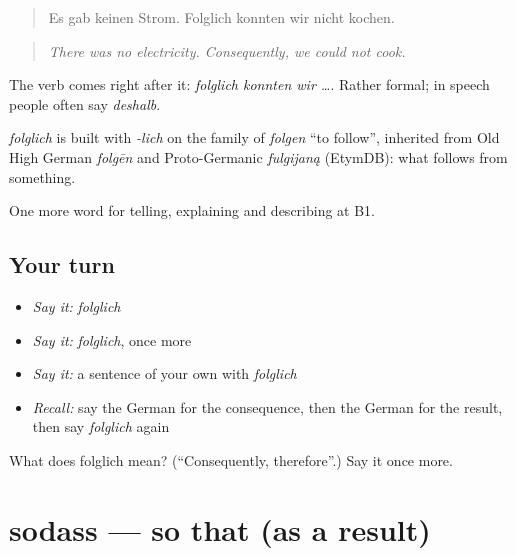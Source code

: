 \begin{quote}
Es gab keinen Strom. Folglich konnten wir nicht kochen.
\end{quote}

\begin{quote}
\emph{There was no electricity. Consequently, we could not cook.}
\end{quote}

The verb comes right after it: \emph{folglich konnten wir …}. Rather formal; in speech people often say \emph{deshalb}.

\begin{cousinweb}
\emph{folglich} is built with \emph{-lich} on the family of \emph{folgen} \textquotedblleft{}to follow\textquotedblright{}, inherited from Old High German \emph{folgēn} and Proto-Germanic \emph{fulgijaną} (EtymDB): what follows from something.
\end{cousinweb}

\begin{grammarlens}[title={What you've built}]
One more word for telling, explaining and describing at B1.
\end{grammarlens}

\subsection*{Your turn}
\begin{itemize}
\raggedright
  \item \emph{Say it:} \emph{folglich}
  \item \emph{Say it:} \emph{folglich}, once more
  \item \emph{Say it:} a sentence of your own with \emph{folglich}
  \item \emph{Recall:} say the German for the consequence, then the German for the result, then say \emph{folglich} again
\end{itemize}

\begin{tcolorbox}[breakable,colback=teal!4,colframe=teal!35!black,title={Before you move on}]
What does folglich mean? (\textquotedblleft{}Consequently, therefore\textquotedblright{}.) Say it once more.
\end{tcolorbox}
\section[sodass]{sodass — so that (as a result)}

\label{lesson:GE-C343-sodass}



